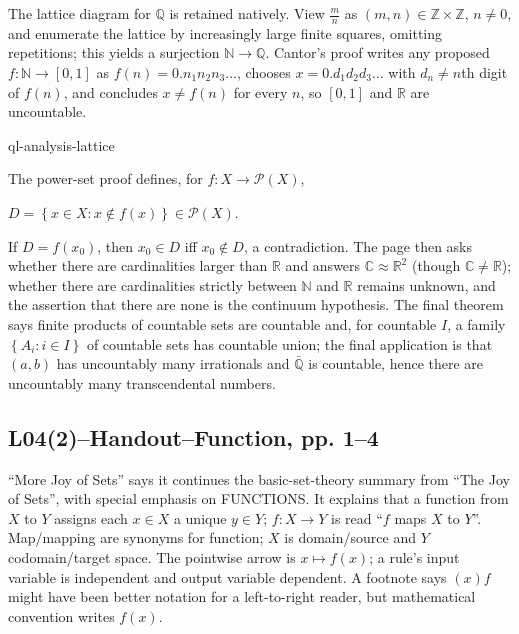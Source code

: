 The lattice diagram for \(\mathbb{Q}\) is retained natively. View \(\frac{m}{n}\) as \(\left( {m,n} \right) \in \mathbb{Z} \times \mathbb{Z}\), \(n \neq 0\), and enumerate the lattice by increasingly large finite squares, omitting repetitions; this yields a surjection \(\mathbb{N}\rightarrow\mathbb{Q}\). Cantor's proof writes any proposed \(f:\mathbb{N}\rightarrow\left\lbrack {0,1} \right\rbrack\) as \(f(n) = 0.n_{1}n_{2}n_{3}\ldots\), chooses \(x = 0.d_{1}d_{2}d_{3}\ldots\) with \(d_{n} \neq n\)th digit of \(f(n)\), and concludes \(x \neq f(n)\) for every \(n\), so \(\left\lbrack {0,1} \right\rbrack\) and \(\mathbb{R}\) are uncountable.

\begin{center}
\begin{qldrawing}
\csname ql-analysis-lattice\endcsname
\end{qldrawing}
\end{center}

The power-set proof defines, for \(f:X\rightarrow\mathcal{P}(X)\),

\(D = \left\{ {x \in X:x \notin f(x)} \right\} \in \mathcal{P}(X).\)

If \(D = f\left( x_{0} \right)\), then \(x_{0} \in D\) iff \(x_{0} \notin D\), a contradiction. The page then asks whether there are cardinalities larger than \(\mathbb{R}\) and answers \(\mathbb{C} \approx \mathbb{R}^{2}\) (though \(\mathbb{C} \neq \mathbb{R}\)); whether there are cardinalities strictly between \(\mathbb{N}\) and \(\mathbb{R}\) remains unknown, and the assertion that there are none is the continuum hypothesis. The final theorem says finite products of countable sets are countable and, for countable \(I\), a family \(\left\{ {A_{i}:i \in I} \right\}\) of countable sets has countable union; the final application is that \(\left( {a,b} \right)\) has uncountably many irrationals and \(\bar{\mathbb{Q}}\) is countable, hence there are uncountably many transcendental numbers.

\subsection{L04(2)--Handout--Function, pp. 1--4}

``More Joy of Sets'' says it continues the basic-set-theory summary from ``The Joy of Sets'', with special emphasis on FUNCTIONS. It explains that a function from \(X\) to \(Y\) assigns each \(x \in X\) a unique \(y \in Y\); \(f:X\rightarrow Y\) is read ``\(f\) maps \(X\) to \(Y\)''. Map/mapping are synonyms for function; \(X\) is domain/source and \(Y\) codomain/target space. The pointwise arrow is \(x\mapsto f(x)\); a rule's input variable is independent and output variable dependent. A footnote says \((x)f\) might have been better notation for a left-to-right reader, but mathematical convention writes \(f(x)\).

